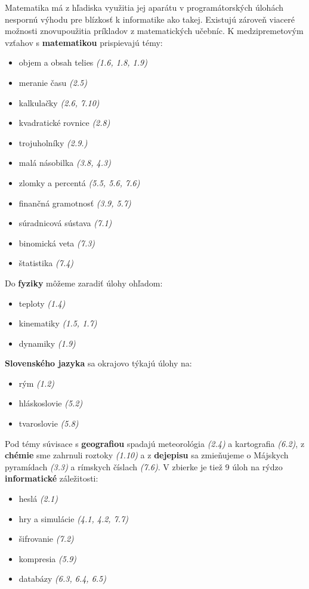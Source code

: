 Matematika má z hľadiska využitia jej aparátu v programátorských úlohách nespornú výhodu pre blízkosť k informatike ako takej. Existujú zároveň viaceré možnosti znovupoužitia príkladov z matematických učebníc. K medzipremetovým vzťahov s \textbf{matematikou} prispievajú témy:
\begin{itemize}[noitemsep,topsep=0pt]
\item objem a obsah telies \emph{(1.6, 1.8, 1.9)}
\item meranie času \emph{(2.5)}
\item kalkulačky \emph{(2.6, 7.10)}
\item kvadratické rovnice \emph{(2.8)}
\item trojuholníky \emph{(2.9.)}
\item malá násobilka \emph{(3.8, 4.3)}
\item zlomky a percentá \emph{(5.5, 5.6, 7.6)}
\item finančná gramotnosť \emph{(3.9, 5.7)}
\item súradnicová sústava \emph{(7.1)}
\item binomická veta \emph{(7.3)}
\item štatistika \emph{(7.4)}
\end{itemize}
Do \textbf{fyziky} môžeme zaradiť úlohy ohľadom: 
\begin{itemize}[noitemsep,topsep=0pt]
\item teploty \emph{(1.4)}
\item kinematiky \emph{(1.5, 1.7)}
\item dynamiky \emph{(1.9)}
\end{itemize}
\textbf{Slovenského jazyka} sa okrajovo týkajú úlohy na:
\begin{itemize}[noitemsep,topsep=0pt]
\item rým \emph{(1.2)}
\item hláskoslovie \emph{(5.2)}
\item tvaroslovie \emph{(5.8)}
\end{itemize}
Pod témy súvisace s \textbf{geografiou} spadajú meteorológia \emph{(2.4)} a kartografia \emph{(6.2)}, z \textbf{chémie} sme zahrnuli roztoky \emph{(1.10)} a z \textbf{dejepisu} sa zmieňujeme o Májskych pyramídach \emph{(3.3)} a rímskych číslach \emph{(7.6)}. 
V zbierke je tiež 9 úloh na rýdzo \textbf{informatické} záležitosti:
\begin{itemize}[noitemsep,topsep=0pt]
\item heslá \emph{(2.1)}
\item hry a simulácie \emph{(4.1, 4.2, 7.7)}
\item šifrovanie \emph{(7.2)}
\item kompresia \emph{(5.9)}
\item databázy \emph{(6.3, 6.4, 6.5)}
\end{itemize}

